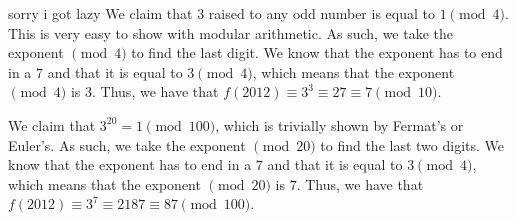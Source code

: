 \documentclass{report}
\begin{document}
sorry i got lazy
\sol We claim that $3$ raised to any odd number is equal to $1 \pmod{4}$. This is very easy to show with modular arithmetic. As such, we take the exponent $\pmod{4}$ to find the last digit. We know that the exponent has to end in a $7$ and that it is equal to $3 \pmod{4}$, which means that the exponent $\pmod{4}$ is $3$. Thus, we have that $f(2012) \equiv 3^3 \equiv 27 \equiv 7 \pmod{10}$.

\sol We claim that $3^{20} = 1 \pmod{100}$, which is trivially shown by Fermat's or Euler's. As such, we take the exponent $\pmod{20}$ to find the last two digits. We know that the exponent has to end in a $7$ and that it is equal to $3 \pmod{4}$, which means that the exponent $\pmod{20}$ is $7$. Thus, we have that $f(2012) \equiv 3^7 \equiv 2187 \equiv 87 \pmod{100}$.
\end{document}
